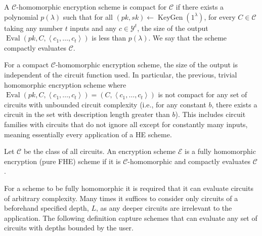 \begin{definition}[Compactness]
A $\mathcal{C}$-homomorphic encryption scheme is compact for $\mathcal{C}$ if there exists a polynomial $p(\lambda)$ such that for all $(pk,sk) \leftarrow \operatorname{KeyGen}(1^{\lambda})$, for every $C \in \mathcal{C}$ taking any number $t$ inputs and any $c \in \mathcal{Y}^t$, the size of the output $\operatorname{Eval}(pk, C, \left\langle c_1, \dots, c_t \right\rangle)$ is less than $p(\lambda)$. We say that the scheme compactly evaluates $\mathcal{C}$.
\end{definition}

For a compact $\mathcal{C}$-homomorphic encryption scheme, the size of the output is independent of the circuit function used. In particular, the previous, trivial homomorphic encryption scheme where $\operatorname{Eval}(pk, C,\left\langle c_1, \dots ,c_t \right\rangle) = (C, \left\langle c_1, \dots, c_t \right \rangle)$ is not compact for any set of circuits with unbounded circuit complexity (i.e., for any constant $b$, there exists a circuit in the set with description length greater than $b$). This includes circuit families with circuits that do not ignore all except for constantly many inputs, meaning essentially every application of a HE scheme.

\begin{definition}
Let $\mathcal{C}$ be the class of all circuits. An encryption scheme $\mathcal{E}$ is a fully homomorphic encryption (pure FHE) scheme if it is $\mathcal{C}$-homomorphic and compactly evaluates $\mathcal{C}$.
\end{definition}

For a scheme to be fully homomorphic it is required that it can evaluate circuits of arbitrary complexity. Many times it suffices to consider only circuits of a beforehand specified depth, $L$, as any deeper circuits are irrelevant to the application. The following definition capture schemes that can evaluate any set of circuits with depths bounded by the user.   

